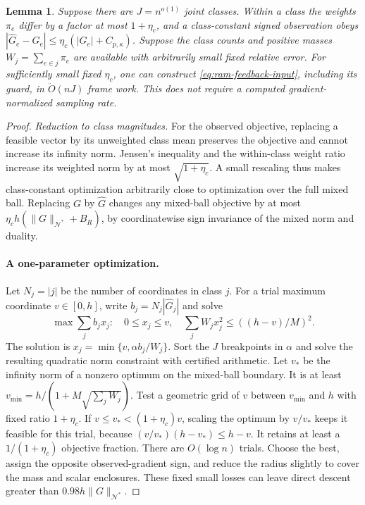 \documentclass[11pt]{article}
\newtheorem{lemma}[theorem]{Lemma}
\theoremstyle{remark}
\newcommand{\norm}[1]{\lVert#1\rVert}
\renewcommand{\O}{\ddot{O}}
\begin{document}
\begin{lemma}
\label{lem:ram-class-feedback}
Suppose there are $J=n^{o(1)}$ joint classes.
Within a class the weights $\pi_e$ differ by a factor at most $1+\eta_c$, and a
class-constant signed observation obeys $|\widehat
G_e-G_e|\le\eta_c(|G_e|+C_{p,\kappa})$.
Suppose the class counts and positive masses $W_j=\sum_{e\in j}\pi_e$ are
available with arbitrarily small fixed relative error.
For sufficiently small fixed $\eta_c$, one can construct
\eqref{eq:ram-feedback-input}, including its guard, in $\O(nJ)$ frame work.
This does not require a computed gradient-normalized sampling rate.
\end{lemma} \begin{proof} \emph{Reduction to class magnitudes.} For the observed
objective, replacing a feasible vector by its unweighted class mean preserves
the objective and cannot increase its infinity norm.
Jensen's inequality and the within-class weight ratio increase its weighted norm
by at most $\sqrt{1+\eta_c}$.
A small rescaling thus makes class-constant optimization arbitrarily close to
optimization over the full mixed ball.
Replacing $G$ by $\widehat G$ changes any mixed-ball objective by at most
$\eta_c h(\norm{G}_{\mathcal N^*}+B_R)$, by coordinatewise sign invariance of
the mixed norm and duality.

\paragraph{A one-parameter optimization.}
Let $N_j=|j|$ be the number of coordinates in class $j$.
For a trial maximum coordinate $v\in[0,h]$, write $b_j=N_j|\widehat G_j|$ and
solve
\[
 \max\sum_jb_jx_j:\quad 0\le x_j\le v,\quad
 \sum_jW_jx_j^2\le((h-v)/M)^2.
\]
The solution is $x_j=\min\{v,\alpha b_j/W_j\}$.
Sort the $J$ breakpoints in $\alpha$ and solve the resulting quadratic norm
constraint with certified arithmetic.
Let $v_*$ be the infinity norm of a nonzero optimum on the mixed-ball boundary.
It is at least $v_{\min}=h/(1+M\sqrt{\sum_jW_j})$.
Test a geometric grid of $v$ between $v_{\min}$ and $h$ with fixed ratio
$1+\eta_c$.
If $v\le v_*<(1+\eta_c)v$, scaling the optimum by $v/v_*$ keeps it feasible for
this trial, because $(v/v_*)(h-v_*)\le h-v$.
It retains at least a $1/(1+\eta_c)$ objective fraction.
There are $O(\log n)$ trials.
Choose the best, assign the opposite observed-gradient sign, and reduce the
radius slightly to cover the mass and scalar enclosures.
These fixed small losses can leave direct descent greater than
$0.98h\norm{G}_{\mathcal N^*}$.


\end{proof}
\end{document}
